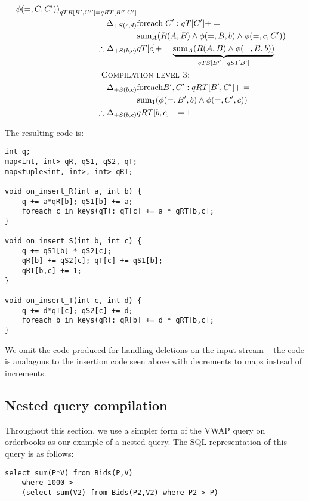 \begin{example}
\begin{align*}
{  \phi(=,C,C'))}_{qTR[B',C''] = qRT[B'',C']}
\\
\Delta_{+S(c,d)} & \algforeach \; C': qT[C'] += \\
& \algsum_{A}(R(A,B) \wedge \phi(=,B,b) \wedge \phi(=,c,C'))\\
\therefore \Delta_{+S(b,c)} & qT[c] +=
\underbrace{\algsum_{A}(R(A,B) \wedge \phi(=,B,b))}_{qTS[B'] = qS1[B']}
\\
& \hspace{-1.5cm}\mbox{\sc Compilation level 3:}\\
\Delta_{+S(b,c)} & \algforeach B',C': qRT[B',C'] += \\
& \algsum_{1}(\phi(=,B',b) \wedge \phi(=,C',c))
\\
\therefore \Delta_{+S(b,c)} & qRT[b,c] += 1
\end{align*}
\end{example}

\noindent The resulting code is:

\begin{verbatim}
int q;
map<int, int> qR, qS1, qS2, qT;
map<tuple<int, int>, int> qRT;

void on_insert_R(int a, int b) {
    q += a*qR[b]; qS1[b] += a;
    foreach c in keys(qT): qT[c] += a * qRT[b,c];
}

void on_insert_S(int b, int c) {
    q += qS1[b] * qS2[c];
    qR[b] += qS2[c]; qT[c] += qS1[b];
    qRT[b,c] += 1;
}

void on_insert_T(int c, int d) {
    q += d*qT[c]; qS2[c] += d;
    foreach b in keys(qR): qR[b] += d * qRT[b,c];
}
\end{verbatim}

We omit the code produced for handling deletions on the input stream -- the code
is analagous to the insertion code seen above with decrements to maps instead of
increments.


\subsection{Nested query compilation}
Throughout this section, we use a simpler form of the VWAP query on orderbooks
as our example of a nested query. The SQL representation of this query is as
follows:

\begin{verbatim}
select sum(P*V) from Bids(P,V)
    where 1000 >
    (select sum(V2) from Bids(P2,V2) where P2 > P)
\end{verbatim}


